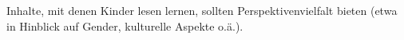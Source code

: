 Inhalte, mit denen Kinder lesen lernen, sollten Perspektivenvielfalt bieten (etwa in Hinblick auf Gender, kulturelle Aspekte o.ä.).